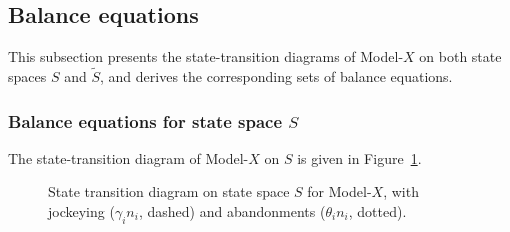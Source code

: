 \subsection{Balance equations}

This subsection presents the state-transition diagrams of Model-$X$ on both state spaces $S$ and $\widetilde{S}$, and derives the corresponding sets of balance equations.

\subsubsection{Balance equations for state space \texorpdfstring{$S$}{S}} \label{sec:gen:balance_equations}

The state-transition diagram of Model-$X$ on $S$ is given in Figure~\ref{fig:diagram-gen}.
\begin{figure}[H]
  \centering
  \resizebox{0.8\textwidth}{!}{%
    
  }
  \caption{State transition diagram on state space $S$ for Model-$X$, with jockeying ($\gamma_i n_i$, dashed) and abandonments ($\theta_i n_i$, dotted).}
  \label{fig:diagram-gen}
\end{figure}

